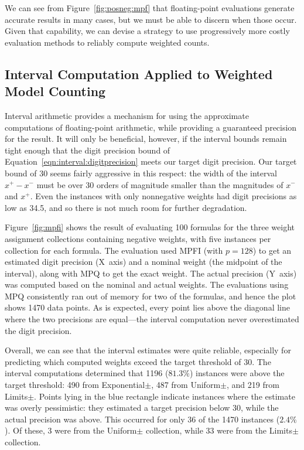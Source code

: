 \documentclass[letterpaper,USenglish,cleveref, autoref, thm-restate]{lipics-v2021}
\newcommand{\xmin}{x^{-}}
\newcommand{\xmax}{x^{+}}
\begin{document}
We can see from Figure~\ref{fig:posneg:mpf} that floating-point
evaluations generate accurate results in many cases, but we must be
able to discern when those occur.  Given that capability, we can
devise a strategy to use progressively more costly evaluation methods
to reliably compute weighted counts.

\subsection{Interval Computation Applied to Weighted Model Counting}

Interval arithmetic provides a mechanism for using the approximate
computations of floating-point arithmetic, while providing a
guaranteed precision for the result.  It will only be beneficial,
however, if the interval bounds remain tight enough that the digit
precision bound of Equation~\ref{eqn:interval:digitprecision} meets
our target digit precision.  Our target bound of 30 seems fairly
aggressive in this respect: the width of the interval $\xmax-\xmin$
must be over 30 orders of magnitude smaller than the magnitudes of
$\xmin$ and $\xmax$.  Even the instances with only nonnegative weights
had digit precisions as low as 34.5, and so there is not much
room for further degradation.

Figure~\ref{fig:mpfi} shows the result of evaluating 100 formulas for
the three weight assignment collections containing negative weights,
with five instances per collection for each formula.  
The evaluation used
MPFI (with $p=128$) to get an estimated digit precision (X~axis) and
a nominal weight (the midpoint of the interval), along with MPQ to get
the exact weight.  The actual precision (Y~axis) was computed based on the
nominal and actual weights.  The evaluations using MPQ consistently ran out of
memory for two of the formulas, and hence the plot shows 1470
data points.  
As is expected, every point lies above the diagonal line where the two precisions are equal---the interval computation never overestimated the digit
precision.


Overall, we can see that the interval estimates were quite reliable,
especially for predicting which computed weights exceed the target
threshold of 30.
The
interval computations determined that 1196 ($81.3\%$) instances were
above the target threshold: 490 from \textsf{Exponential$\pm$}, 487 from
\textsf{Uniform$\pm$}, and 219 from \textsf{Limits$\pm$}.
Points lying in the blue rectangle
indicate instances where the estimate was overly pessimistic: they
estimated a target precision below 30, while the actual precision was
above.  This occurred for only 36 of the 1470 instances ($2.4\%$).  Of
these, 3 were from the \textsf{Uniform$\pm$} collection, while 33 were
from the \textsf{Limits$\pm$} collection.  
\end{document}

